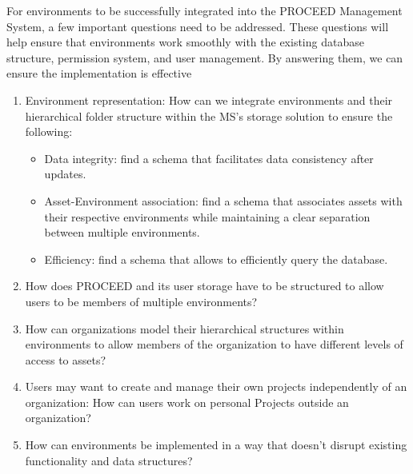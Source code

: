 For environments to be successfully integrated into the PROCEED Management System,
a few important questions need to be addressed.
These questions will help ensure that environments work smoothly with the existing database structure,
permission system, and user management.
By answering them, we can ensure the implementation is effective



\begin{enumerate}

	\item Environment representation: How can we integrate environments and their hierarchical
	      folder structure within the MS's storage solution to ensure the following:
	      \begin{itemize}
		      \item Data integrity: find a schema that facilitates data consistency after updates.
		      \item Asset-Environment association: find a schema that associates assets with their
		            respective environments while maintaining a clear separation between
		            multiple environments.
		      \item Efficiency: find a schema that allows to efficiently query the database.
	      \end{itemize}

	\item How does PROCEED and its user storage have to be structured to allow users to be
	      members of multiple environments?

	\item How can organizations model their hierarchical structures within environments
	      to allow members of the organization to have different levels of access to assets?

	\item Users may want to create and manage their own projects independently of an
	      organization: How can users work on personal Projects outside an organization?

	\item How can environments be implemented in a way that doesn't disrupt existing
	      functionality and data structures?



\end{enumerate}
